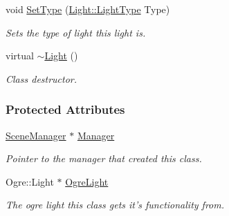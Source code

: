 \begin{DoxyCompactItemize}
void \hyperlink{classphys_1_1Light_a87fced0afb0fd44d333c499d41e8568a}{SetType} (\hyperlink{classphys_1_1Light_aef1be63d57f59f33bf4c66be797009bf}{Light::LightType} Type)
\begin{DoxyCompactList}\small\item\em Sets the type of light this light is. \item\end{DoxyCompactList}\item 
\hypertarget{classphys_1_1Light_a0ee3882bb8e1e613bd88380a9681af2e}{
virtual \hyperlink{classphys_1_1Light_a0ee3882bb8e1e613bd88380a9681af2e}{$\sim$Light} ()}
\label{classphys_1_1Light_a0ee3882bb8e1e613bd88380a9681af2e}

\begin{DoxyCompactList}\small\item\em Class destructor. \item\end{DoxyCompactList}\end{DoxyCompactItemize}
\subsubsection*{Protected Attributes}
\begin{DoxyCompactItemize}
\item 
\hypertarget{classphys_1_1Light_a2633fc1795d2a3e2ddddc71674a7eb84}{
\hyperlink{classphys_1_1SceneManager}{SceneManager} $\ast$ \hyperlink{classphys_1_1Light_a2633fc1795d2a3e2ddddc71674a7eb84}{Manager}}
\label{classphys_1_1Light_a2633fc1795d2a3e2ddddc71674a7eb84}

\begin{DoxyCompactList}\small\item\em Pointer to the manager that created this class. \item\end{DoxyCompactList}\item 
\hypertarget{classphys_1_1Light_a20fc9136847907955cfb8c1a47d6ec6a}{
Ogre::Light $\ast$ \hyperlink{classphys_1_1Light_a20fc9136847907955cfb8c1a47d6ec6a}{OgreLight}}
\label{classphys_1_1Light_a20fc9136847907955cfb8c1a47d6ec6a}

\begin{DoxyCompactList}\small\item\em The ogre light this class gets it's functionality from. \item\end{DoxyCompactList}\end{DoxyCompactItemize}


